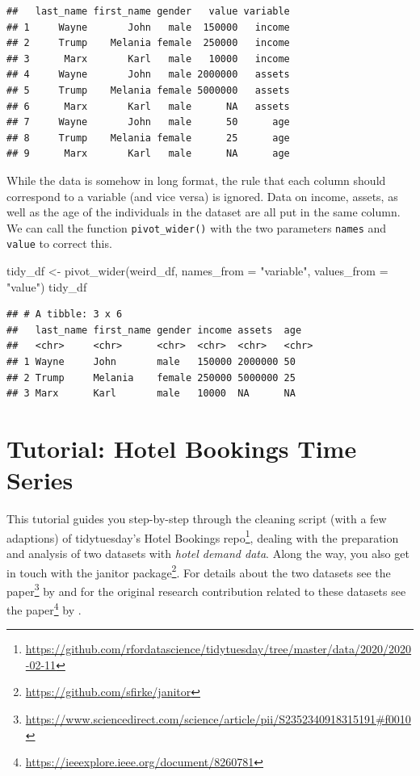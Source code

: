 \documentclass[
  12pt,
]{style/krantz}
\newenvironment{Shaded}{\begin{snugshade}}{\end{snugshade}}
\newcommand{\AttributeTok}[1]{\textcolor[rgb]{0.77,0.63,0.00}{#1}}
\newcommand{\FunctionTok}[1]{\textcolor[rgb]{0.00,0.00,0.00}{#1}}
\newcommand{\NormalTok}[1]{#1}
\newcommand{\OtherTok}[1]{\textcolor[rgb]{0.56,0.35,0.01}{#1}}
\newcommand{\StringTok}[1]{\textcolor[rgb]{0.31,0.60,0.02}{#1}}
\renewcommand{\href}[2]{#2\footnote{\url{#1}}}
\begin{document}
\begin{verbatim}
##   last_name first_name gender   value variable
## 1     Wayne       John   male  150000   income
## 2     Trump    Melania female  250000   income
## 3      Marx       Karl   male   10000   income
## 4     Wayne       John   male 2000000   assets
## 5     Trump    Melania female 5000000   assets
## 6      Marx       Karl   male      NA   assets
## 7     Wayne       John   male      50      age
## 8     Trump    Melania female      25      age
## 9      Marx       Karl   male      NA      age
\end{verbatim}

While the data is somehow in long format, the rule that each column should correspond to a variable (and vice versa) is ignored. Data on income, assets, as well as the age of the individuals in the dataset are all put in the same column. We can call the function \texttt{pivot\_wider()} with the two parameters \texttt{names} and \texttt{value} to correct this.

\begin{Shaded}
\begin{Highlighting}[]
\NormalTok{tidy\_df }\OtherTok{\textless{}{-}} \FunctionTok{pivot\_wider}\NormalTok{(weird\_df, }\AttributeTok{names\_from =} \StringTok{"variable"}\NormalTok{, }\AttributeTok{values\_from =} \StringTok{"value"}\NormalTok{)}
\NormalTok{tidy\_df}
\end{Highlighting}
\end{Shaded}

\begin{verbatim}
## # A tibble: 3 x 6
##   last_name first_name gender income assets  age  
##   <chr>     <chr>      <chr>  <chr>  <chr>   <chr>
## 1 Wayne     John       male   150000 2000000 50   
## 2 Trump     Melania    female 250000 5000000 25   
## 3 Marx      Karl       male   10000  NA      NA
\end{verbatim}

\hypertarget{tutorial-hotel-bookings-time-series}{%
\section{Tutorial: Hotel Bookings Time Series}\label{tutorial-hotel-bookings-time-series}}

This tutorial guides you step-by-step through the cleaning script (with a few adaptions) of \href{https://github.com/rfordatascience/tidytuesday/tree/master/data/2020/2020-02-11}{tidytuesday's Hotel Bookings repo}, dealing with the preparation and analysis of two datasets with \emph{hotel demand data}. Along the way, you also get in touch with the \href{https://github.com/sfirke/janitor}{janitor package}. For details about the two datasets see the \href{https://www.sciencedirect.com/science/article/pii/S2352340918315191\#f0010}{paper} by \citet{nuno_etal2019} and for the original research contribution related to these datasets see the \href{https://ieeexplore.ieee.org/document/8260781}{paper} by \citet{nunes_etal2017}.
\end{document}

